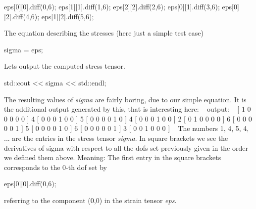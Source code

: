 \begin{DoxyCode}
eps[0][0].diff(0,6);
eps[1][1].diff(1,6);
eps[2][2].diff(2,6);
eps[0][1].diff(3,6);
eps[0][2].diff(4,6);
eps[1][2].diff(5,6);
\end{DoxyCode}
 The equation describing the stresses (here just a simple test case) 
\begin{DoxyCode}
sigma = eps;
\end{DoxyCode}
 Let\textquotesingle{}s output the computed stress tensor. 
\begin{DoxyCode}
std::cout << sigma << std::endl;
\end{DoxyCode}
 The resulting values of {\itshape sigma} are fairly boring, due to our simple equation. It is the additional output generated by this, that is interesting here\+: ~\newline
output\+: ~ \mbox{[} 1 0 0 0 0 0 \mbox{]} 4 \mbox{[} 0 0 0 1 0 0 \mbox{]} 5 \mbox{[} 0 0 0 0 1 0 \mbox{]} 4 \mbox{[} 0 0 0 1 0 0 \mbox{]} 2 \mbox{[} 0 1 0 0 0 0 \mbox{]} 6 \mbox{[} 0 0 0 0 0 1 \mbox{]} 5 \mbox{[} 0 0 0 0 1 0 \mbox{]} 6 \mbox{[} 0 0 0 0 0 1 \mbox{]} 3 \mbox{[} 0 0 1 0 0 0 \mbox{]} ~\newline
The numbers 1, 4, 5, 4, ... are the entries in the stress tensor {\itshape sigma}. In square brackets we see the derivatives of sigma with respect to all the dofs set previously given in the order we defined them above. Meaning\+: The first entry in the square brackets corresponds to the 0-\/th dof set by 
\begin{DoxyCode}
eps[0][0].diff(0,6); 
\end{DoxyCode}
 referring to the component (0,0) in the strain tensor {\itshape eps}.

